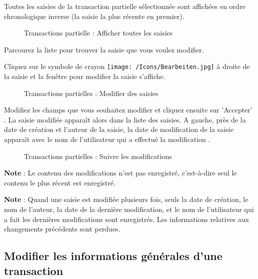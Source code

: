 Toutes les saisies de la transaction partielle sélectionnée sont affichées en ordre chronologique inverse (la saisie la plus récente en premier).

\begin{figure}[H]
\caption{Transactions partielle : Afficher toutes les saisies}
\end{figure}

Parcourez la liste pour trouver la saisie que vous voulez modifier.

\vspace{\baselineskip}

Cliquez sur le symbole de crayon \texttt{[image: /Icons/Bearbeiten.jpg]}  à droite de la saisie et la fenêtre pour modifier la saisie s'affiche.

\begin{figure}[H]
\caption{Transactions partielles : Modifier des saisies}
\end{figure}

Modifiez les champs que vous souhaitez modifier et cliquez ensuite sur 'Accepter' . La saisie modifiée apparaît alors dans la liste des saisies. A gauche, près de la date de création et l'auteur de la saisie, la date de modification de la saisie apparaît avec le nom de l'utilisateur qui a effectué la modification .

\begin{figure}[H]
\caption{Transactions partielles : Suivre les modifications}
\end{figure}

\textbf{Note} : Le contenu des modifications n'est pas enregistré, c'est-à-dire seul le contenu le plus récent est enregistré.

\vspace{\baselineskip}

\textbf{Note} : Quand une saisie est modifiée plusieurs fois, seuls la date de création, le nom de l'auteur, la date de la dernière modification, et le nom de l'utilisateur qui a fait les dernières modifications sont enregistrés. Les informations relatives aux changements précédents sont perdues.

\subsection{Modifier les informations générales d'une transaction}

